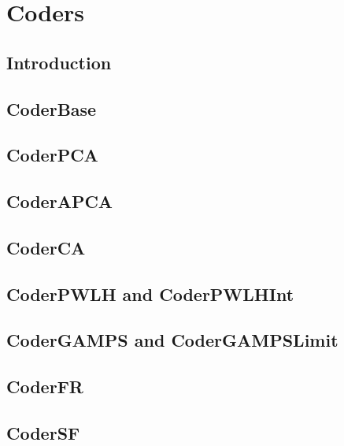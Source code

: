 
\chapter{Coders} %

\label{coders} %


\section{Introduction}
\label{coders:intro}

\section{CoderBase}
\label{coders:base}


\section{CoderPCA}
\label{coders:pca}

\section{CoderAPCA}
\label{coders:apca}

\section{CoderCA}
\label{coders:ca}

\section{CoderPWLH and CoderPWLHInt}
\label{coders:pwlh}

\section{CoderGAMPS and CoderGAMPSLimit}
\label{coders:gamps}

\section{CoderFR}
\label{coders:fr}

\section{CoderSF}
\label{coders:sf}
